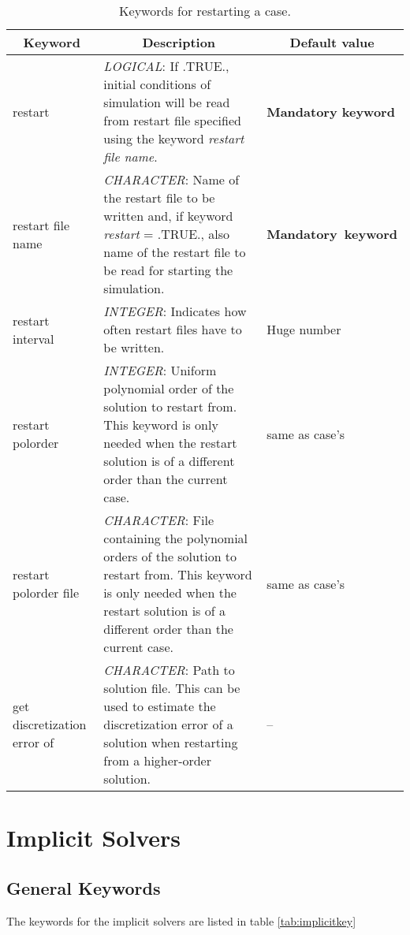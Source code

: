 \documentclass[a4paper,10pt]{report}
\begin{document}
\begin{table}[htbp]
\caption{Keywords for restarting a case.}
\begin{tabular}{|l|p{10cm}|p{2.2cm}|}
\hline
\multicolumn{1}{|c|}{Keyword} & \multicolumn{1}{c|}{Description} & \multicolumn{1}{c|}{Default value} \\ \hline

restart 			& \textit{LOGICAL}: If .TRUE., initial conditions of simulation will be read from restart file specified using the keyword \textit{restart file name}. & \textbf{Mandatory keyword} \\ \hline

restart file name   & \textit{CHARACTER}: Name of the restart file to be written and, if keyword \textit{restart} = .TRUE., also name of the restart file to be read for starting the simulation. & \textbf{Mandatory\ keyword} \\ \hline

restart interval    & \textit{INTEGER}: Indicates how often restart files have to be written. & Huge number \\ \hline

restart polorder & \textit{INTEGER}: Uniform polynomial order of the solution to restart from. This keyword is only needed when the restart solution is of a different order than the current case. & same as case's \\ \hline

restart polorder file & 
			\textit{CHARACTER}: File containing the polynomial orders of the solution to restart from. This keyword is only needed when the restart solution is of a different order than the current case.  &  same as case's\\ \hline

get discretization error of & \textit{CHARACTER}: Path to solution file. This can be used to estimate the discretization error of a solution when restarting from a higher-order solution. & -- \\ \hline

\end{tabular}
\label{tab:restartkey}
\end{table}


\chapter{Implicit Solvers}
\section{General Keywords}
The keywords for the implicit solvers are listed in table \ref{tab:implicitkey}
\end{document}
